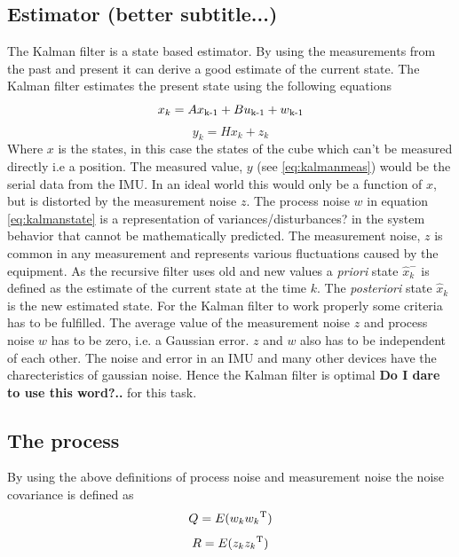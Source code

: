 \documentclass[a4paper,11pt]{kth-mag}
\begin{document}
\subsection{Estimator (better subtitle...)}
The Kalman filter is a state based estimator. By using the measurements from the past and present it can derive a good estimate of the current state. The Kalman filter estimates the present state using the following equations
\begin{equation}\label{eq:kalmanstate}
x_k = Ax\textsubscript{k-1}+Bu\textsubscript{k-1}+w\textsubscript{k-1}
\end{equation}
\begin{equation} \label{eq:kalmanmeas}
y_k = Hx_k + z_k
\end{equation}
Where $x$ is the states, in this case the states of the cube which can't be measured directly i.e a position. The measured value, $y$ (see \eqref{eq:kalmanmeas}) would be the serial data from the IMU. In an ideal world this would only be a function of $x$, but is distorted by the measurement noise $z$.
The process noise $w$ in equation \eqref{eq:kalmanstate} is a representation of variances/disturbances? in the system behavior that cannot be mathematically predicted. The measurement noise, $z$ is common in any measurement and represents various fluctuations caused by the equipment. As the recursive filter uses old and new values a \textit{priori} state $\hat{x}^-_k$  is defined as the estimate of the current state at the time $k$. The \textit{posteriori} state $\hat{x}_k$ is the new estimated state.
For the Kalman filter to work properly some criteria has to be fulfilled. The average value of the measurement noise $z$ and process noise $w$ has to be zero, i.e. a Gaussian error. $z$ and $w$ also has to be independent of  each other. The noise and error in an IMU and many other devices have the charecteristics of gaussian noise. Hence the Kalman filter is optimal \textbf{Do I dare to use this word?..} for this task.

\subsection{The process} 
By using the above definitions of process noise and measurement noise the noise covariance is defined as
\begin{equation} \label{eq:covariance process noise}
Q = E(w_k w_k \textsuperscript{T})
\end{equation}
\begin{equation} \label{eq:covariance measurement noise}
R = E(z_k z_k \textsuperscript{T} )
\end{equation}
\end{document}
